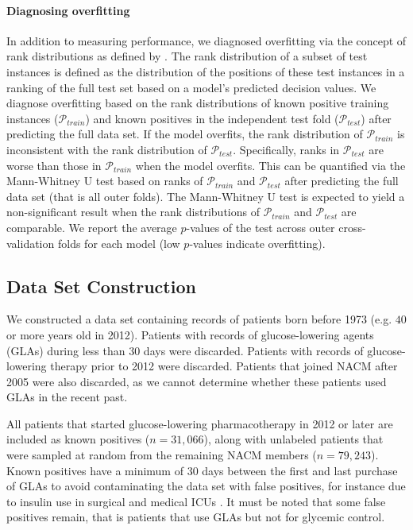 \documentclass[twoside,11pt]{article}
\begin{document}
\paragraph{Diagnosing overfitting} 
In addition to measuring performance, we diagnosed overfitting via the concept of rank distributions as defined by \citet{claesen2015icml}. The rank distribution of a subset of test instances is defined as the distribution of the positions of these test instances in a ranking of the full test set based on a model's predicted decision values. We diagnose overfitting based on the rank distributions of known positive training instances ($\mathcal{P}_{train}$) and known positives in the independent test fold ($\mathcal{P}_{test}$) after predicting the full data set. If the model overfits, the rank distribution of $\mathcal{P}_{train}$ is inconsistent with the rank distribution of $\mathcal{P}_{test}$. Specifically, ranks in $\mathcal{P}_{test}$ are worse than those in $\mathcal{P}_{train}$ when the model overfits. This can be quantified via the Mann-Whitney U test \citep{mann1947test} based on ranks of $\mathcal{P}_{train}$ and $\mathcal{P}_{test}$ after predicting the full data set (that is all outer folds). The Mann-Whitney U test is expected to yield a non-significant result when the rank distributions of $\mathcal{P}_{train}$ and $\mathcal{P}_{test}$ are comparable. We report the average $p$-values of the test across outer cross-validation folds for each model (low $p$-values indicate overfitting).


\subsection{Data Set Construction} \label{data}
We constructed a data set containing records of patients born before 1973 (e.g. $40$ or more years old in 2012). Patients with records of glucose-lowering agents (GLAs) during less than 30 days were discarded. Patients with records of glucose-lowering therapy prior to 2012 were discarded. Patients that joined NACM after 2005 were also discarded, as we cannot determine whether these patients used GLAs in the recent past. 

All patients that started glucose-lowering pharmacotherapy in 2012 or later are included as known positives ($n=31,066$), along with unlabeled patients that were sampled at random from the remaining NACM members ($n=79,243$). Known positives have a minimum of 30 days between the first and last purchase of GLAs to avoid contaminating the data set with false positives, for instance due to insulin use in surgical and medical ICUs \citep{van2001intensive, van2006intensive}. It must be noted that some false positives remain, that is patients that use GLAs but not for glycemic control.
\end{document}
